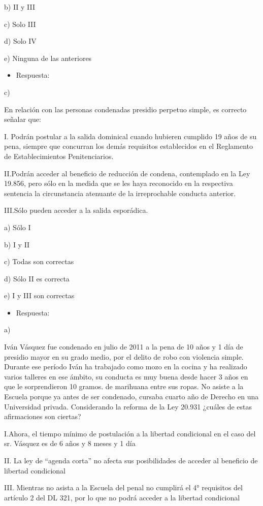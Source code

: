 \documentclass[letterpaper, 11pt]{article}
\begin{document}
b) II y III

c) Solo III

d) Solo IV

e) Ninguna de las anteriores

\begin{itemize}
\item Respuesta:
\end{itemize}
c)


En relación con las personas condenadas presidio perpetuo simple, es correcto
señalar que:

I. Podrán postular a la salida dominical cuando hubieren cumplido 19 años de su
pena, siempre que concurran los demás requisitos establecidos en el Reglamento
de Establecimientos Penitenciarios.

II.Podrán acceder al beneficio de reducción de condena, contemplado en la Ley
19.856, pero sólo en la medida que se les haya reconocido en la respectiva
sentencia la circunstancia atenuante de la irreprochable conducta anterior.

III.Sólo pueden acceder a la salida esporádica.

a) Sólo I

b) I y II

c) Todas son correctas

d) Sólo II es correcta

e) I y III son correctas

\begin{itemize}
\item Respuesta:
\end{itemize}
a)


Iván Vásquez fue condenado en julio de 2011 a la pena de 10 años y 1
día de presidio mayor en su grado medio, por el delito de robo con
violencia simple.  Durante ese período Iván ha trabajado como mozo en
la cocina y ha realizado varios talleres en ese ámbito, su conducta es
muy buena desde hacer 3 años en que le sorprendieron 10 gramos. de
marihuana entre sus ropas. No asiste a la Escuela porque ya antes de
ser condenado, cursaba cuarto año de Derecho en una Universidad
privada. Considerando la reforma de la Ley 20.931 ¿cuáles de estas
afirmaciones son ciertas?

I.Ahora, el tiempo mínimo de postulación a la libertad condicional en
el caso del sr.  Vásquez es de 6 años y 8 meses y 1 día

II. La ley de “agenda corta” no afecta sus posibilidades de acceder al
beneficio de libertad condicional

III. Mientras no asista a la Escuela del penal no cumplirá el 4°
requisitos del artículo 2 del DL 321, por lo que no podrá acceder a la
libertad condicional
\end{document}
